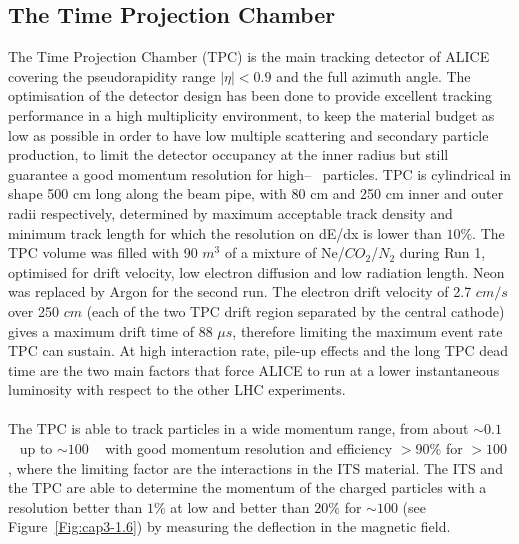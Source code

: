\subsection{The Time Projection Chamber}
\label{par:3.2b}
The Time Projection Chamber (TPC) is the main tracking detector of ALICE covering the pseudorapidity range $|\eta| < 0.9 $ and the full azimuth angle. The optimisation of the detector design has been done to provide excellent tracking performance in a high multiplicity environment, to keep the material budget as low as possible in order to have low multiple scattering and secondary particle production, to limit the detector occupancy at the inner radius but still guarantee a good momentum resolution for high–\pT~ particles. TPC is cylindrical in shape 500 cm long along the beam pipe, with 80 cm and 250 cm inner and outer radii respectively, determined by maximum acceptable track density and  minimum track length for which the resolution on dE/dx is lower than $10\%$. The TPC volume was filled with 90 $m^3$ of a mixture of Ne/$CO_{2}$/$N_{2}$ during Run 1, optimised for drift velocity, low electron diffusion and low radiation length. Neon was replaced by Argon for the second run. The electron drift velocity of 2.7 $cm/s$ over 250 $cm$ (each of the two TPC drift region separated by the central cathode) gives a maximum drift time of 88 $\mu s$, therefore limiting the maximum event rate TPC can sustain. At high interaction rate, pile-up effects and the long TPC dead time are the two main factors that force ALICE to run at a lower instantaneous luminosity with respect to the other LHC experiments. \\
\\
The TPC is able to track particles in a wide momentum range, from about \pT $\sim 0.1$ \GeVc~ up to \pT$\sim 100$ \GeVc~ with good momentum resolution and efficiency $>90\%$ for \pT$ > 100$ \MeVc, where the limiting factor are the interactions in the ITS material. The ITS and the TPC are able to determine the momentum of the charged particles with a resolution better than $1\%$ at low \pT and better than $20\%$ for \pT$\sim 100$ \GeVc (see \mbox{Figure \ref{Fig:cap3-1.6}}) by measuring the deflection in the magnetic field.\\

